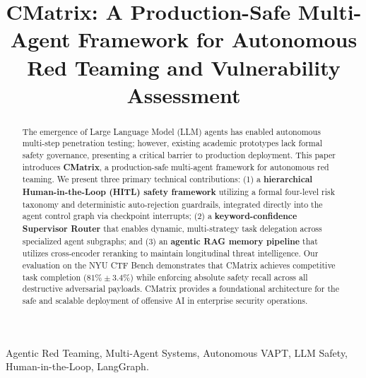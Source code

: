 \documentclass[conference,compsoc]{IEEEtran}
\begin{document}
\title{CMatrix: A Production-Safe Multi-Agent Framework for Autonomous Red Teaming and Vulnerability Assessment}

\author{
}

\maketitle

\begin{abstract}
The emergence of Large Language Model (LLM) agents has enabled autonomous multi-step penetration testing; however, existing academic prototypes lack formal safety governance, presenting a critical barrier to production deployment. This paper introduces \textbf{CMatrix}, a production-safe multi-agent framework for autonomous red teaming. We present three primary technical contributions: (1) a \textbf{hierarchical Human-in-the-Loop (HITL) safety framework} utilizing a formal four-level risk taxonomy and deterministic auto-rejection guardrails, integrated directly into the agent control graph via checkpoint interrupts; (2) a \textbf{keyword-confidence Supervisor Router} that enables dynamic, multi-strategy task delegation across specialized agent subgraphs; and (3) an \textbf{agentic RAG memory pipeline} that utilizes cross-encoder reranking to maintain longitudinal threat intelligence. Our evaluation on the NYU CTF Bench demonstrates that CMatrix achieves competitive task completion ($81\% \pm 3.4\%$) while enforcing absolute safety recall across all destructive adversarial payloads. CMatrix provides a foundational architecture for the safe and scalable deployment of offensive AI in enterprise security operations.
\end{abstract}

\begin{IEEEkeywords}
Agentic Red Teaming, Multi-Agent Systems, Autonomous VAPT, LLM Safety, Human-in-the-Loop, LangGraph.
\end{IEEEkeywords}
\end{document}
